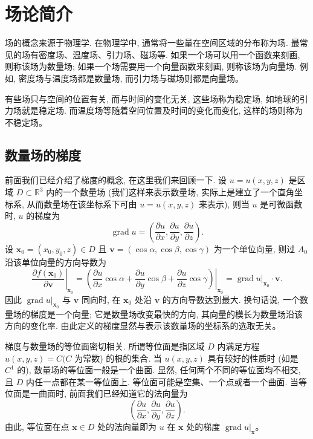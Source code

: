 \documentclass[UTF8, 12pt, fontset=fandol, oneside]{ctexart}
\begin{document}
\section{场论简介}

场的概念来源于物理学. 在物理学中, 通常将一些量在空间区域的分布称为场. 最常见的场有密度场、温度场、引力场、磁场等. 如果一个场可以用一个函数来刻画, 则称该场为数量场; 如果一个场需要用一个向量函数来刻画, 则称该场为向量场. 例如, 密度场与温度场都是数量场, 而引力场与磁场则都是向量场。

有些场只与空间的位置有关, 而与时间的变化无关, 这些场称为稳定场, 如地球的引力场就是稳定场. 而温度场等随着空间位置及时间的变化而变化, 这样的场则称为不稳定场。

\subsection{数量场的梯度}

前面我们已经介绍了梯度的概念, 在这里我们来回顾一下. 设 $u=u(x,y,z)$ 是区域 $D\subset\mathbb R^3$ 内的一个数量场 (我们这样来表示数量场, 实际上是建立了一个直角坐标系, 从而数量场在该坐标系下可由 $u=u(x,y,z)$ 来表示), 则当 $u$ 是可微函数时, $u$ 的梯度为
\[
  \operatorname{grad}u=
  \left(\frac{\partial u}{\partial x},\frac{\partial u}{\partial y},\frac{\partial u}{\partial z}\right).
\]
设 $\boldsymbol x_0=(x_0,y_0,z)\in D$ 且 $\boldsymbol v=(\cos\alpha,\cos\beta,\cos\gamma)$ 为一个单位向量, 则过 $A_0$ 沿该单位向量的方向导数为
\[
  \left.\frac{\partial f(\boldsymbol x_0)}{\partial\boldsymbol v}\right|_{\boldsymbol x_0}
  =
  \left.\left(\frac{\partial u}{\partial x}\cos\alpha+\frac{\partial u}{\partial y}\cos\beta+\frac{\partial u}{\partial z}\cos\gamma\right)\right|_{\boldsymbol x_0}
  =
  \left.\operatorname{grad}u\right|_{\boldsymbol x_0}\cdot\boldsymbol v.
\]
因此 $\left.\operatorname{grad}u\right|_{\boldsymbol x_0}$ 与 $\boldsymbol v$ 同向时, 在 $\boldsymbol x_0$ 处沿 $\boldsymbol v$ 的方向导数达到最大. 换句话说, 一个数量场的梯度是一个向量; 它是数量场改变最快的方向, 其向量的模长为数量场沿该方向的变化率. 由此定义的梯度显然与表示该数量场的坐标系的选取无关。

梯度与数量场的等位面密切相关. 所谓等位面是指区域 $D$ 内满足方程 $u(x,y,z)=C(C$ 为常数) 的根的集合. 当 $u(x,y,z)$ 具有较好的性质时 (如是 $C^1$ 的), 数量场的等位面一般是一个曲面. 显然, 任何两个不同的等位面均不相交, 且 $D$ 内任一点都在某一等位面上. 等位面可能是空集、一个点或者一个曲面. 当等位面是一曲面时, 前面我们已经知道它的法向量为
\[
  \left(\frac{\partial u}{\partial x},\frac{\partial u}{\partial y},\frac{\partial u}{\partial z}\right).
\]
由此, 等位面在点 $\boldsymbol x\in D$ 处的法向量即为 $u$ 在 $\boldsymbol x$ 处的梯度 $\left.\operatorname{grad}u\right|_{\boldsymbol x}$。
\end{document}
